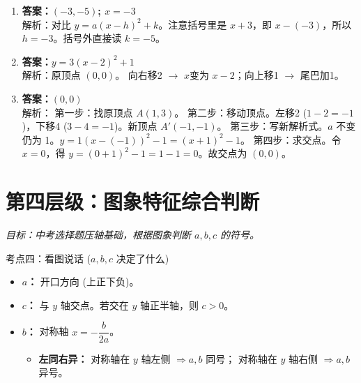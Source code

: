 \documentclass[12pt, a4paper]{article}
\begin{document}
\begin{answerbox}
    \begin{enumerate}
        \item \textbf{答案：$(-3, -5)$; $x=-3$} \\
        解析：对比 $y=a(x-h)^2+k$。注意括号里是 $x+3$，即 $x-(-3)$，所以 $h=-3$。括号外直接读 $k=-5$。
        
        \item \textbf{答案：$y = 3(x-2)^2 + 1$} \\
        解析：原顶点 $(0,0)$。
        向右移2 $\rightarrow$ $x$变为 $x-2$；向上移1 $\rightarrow$ 尾巴加1。
        
        \item \textbf{答案：$(0, 0)$} \\
        解析：
        第一步：找原顶点 $A(1, 3)$。
        第二步：移动顶点。左移2 ($1-2=-1$)，下移4 ($3-4=-1$)。新顶点 $A'(-1, -1)$。
        第三步：写新解析式。$a$ 不变仍为 1。$y = 1(x - (-1))^2 - 1 = (x+1)^2 - 1$。
        第四步：求交点。令 $x=0$，得 $y = (0+1)^2 - 1 = 1 - 1 = 0$。故交点为 $(0,0)$。
    \end{enumerate}
\end{answerbox}

\section{第四层级：图象特征综合判断}
\textit{目标：中考选择题压轴基础，根据图象判断 $a, b, c$ 的符号。}

\begin{conceptbox}{考点四：看图说话 ($a, b, c$ 决定了什么)}
    \begin{itemize}
        \item \textbf{$a$：} 开口方向 (上正下负)。
        \item \textbf{$c$：} 与 $y$ 轴交点。若交在 $y$ 轴正半轴，则 $c>0$。
        \item \textbf{$b$：} 对称轴 $x = -\dfrac{b}{2a}$。
        \begin{itemize}
            \item \textbf{左同右异：} 
            对称轴在 $y$ 轴左侧 $\Rightarrow a, b$ 同号；
            对称轴在 $y$ 轴右侧 $\Rightarrow a, b$ 异号。
        \end{itemize}
    \end{itemize}
\end{conceptbox}
\end{document}
